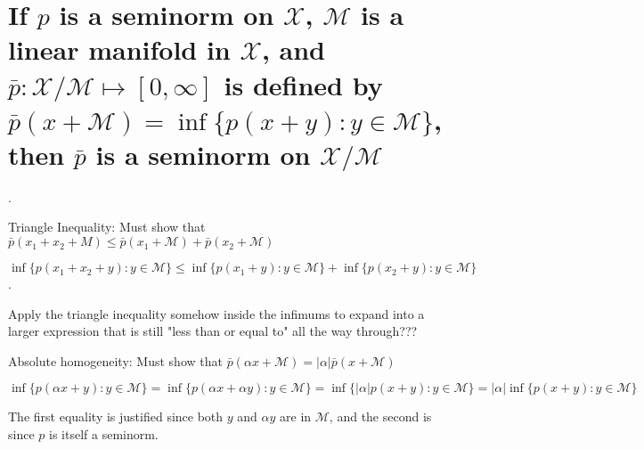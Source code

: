 \documentclass{article}
\begin{document}
\section{If $p$ is a seminorm on $\mathscr{X}$, $\mathscr{M}$ is a linear manifold in $\mathscr{X}$, and $\bar{p}: \mathscr{X} / \mathscr{M} \mapsto [0,\infty]$ is defined by $\bar{p}(x + \mathscr{M}) = \inf\{p(x+y):y \in \mathscr{M}\}$, then $\bar{p}$ is a seminorm on $\mathscr{X} / \mathscr{M}$}.

Triangle Inequality: Must show that $\bar{p}(x_1+x_2+M) \le \bar{p}(x_1+\mathscr{M}) + \bar{p}(x_2+\mathscr{M})$

$\inf\{p(x_1 + x_2 + y) : y \in \mathscr{M}\} \le \inf\{p(x_1 + y) : y \in \mathscr{M}\} + \inf\{p(x_2 + y ): y \in \mathscr{M}\}$.

Apply the triangle inequality somehow inside the infimums to expand into a larger expression that is still "less than or equal to" all the way through???

Absolute homogeneity: Must show that $\bar{p}(\alpha x + \mathscr{M}) = |\alpha|\bar{p}(x + \mathscr{M})$

$\inf\{p( \alpha x +y) : y \in \mathscr{M}\} = \inf\{p( \alpha x + \alpha y) : y \in \mathscr{M}\} = \inf\{  | \alpha | p( x +y) : y \in \mathscr{M}\}  =  | \alpha | \inf\{p( x +y) : y \in \mathscr{M}\} $

The first equality is justified since both $y$ and $\alpha y$ are in $\mathscr{M}$, and the second is since $p$ is itself a seminorm.
\end{document}
